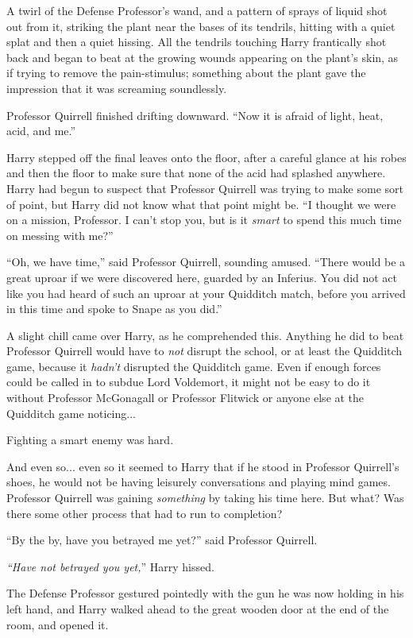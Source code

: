 A twirl of the Defense Professor's wand, and a pattern of sprays of liquid shot out from it, striking the plant near the bases of its tendrils, hitting with a quiet splat and then a quiet hissing. All the tendrils touching Harry frantically shot back and began to beat at the growing wounds appearing on the plant's skin, as if trying to remove the pain-stimulus; something about the plant gave the impression that it was screaming soundlessly.

Professor Quirrell finished drifting downward. ``Now it is afraid of light, heat, acid, and me.''

Harry stepped off the final leaves onto the floor, after a careful glance at his robes and then the floor to make sure that none of the acid had splashed anywhere. Harry had begun to suspect that Professor Quirrell was trying to make some sort of point, but Harry did not know what that point might be. ``I thought we were on a mission, Professor. I can't stop you, but is it \emph{smart} to spend this much time on messing with me?''

``Oh, we have time,'' said Professor Quirrell, sounding amused. ``There would be a great uproar if we were discovered here, guarded by an Inferius. You did not act like you had heard of such an uproar at your Quidditch match, before you arrived in this time and spoke to Snape as you did.''

A slight chill came over Harry, as he comprehended this. Anything he did to beat Professor Quirrell would have to \emph{not} disrupt the school, or at least the Quidditch game, because it \emph{hadn't} disrupted the Quidditch game. Even if enough forces could be called in to subdue Lord Voldemort, it might not be easy to do it without Professor McGonagall or Professor Flitwick or anyone else at the Quidditch game noticing...

Fighting a smart enemy was hard.

And even so... even so it seemed to Harry that if he stood in Professor Quirrell's shoes, he would not be having leisurely conversations and playing mind games. Professor Quirrell was gaining \emph{something} by taking his time here. But what? Was there some other process that had to run to completion?

``By the by, have you betrayed me yet?'' said Professor Quirrell.

\emph{``Have not betrayed you yet,}'' Harry hissed.

The Defense Professor gestured pointedly with the gun he was now holding in his left hand, and Harry walked ahead to the great wooden door at the end of the room, and opened it.

